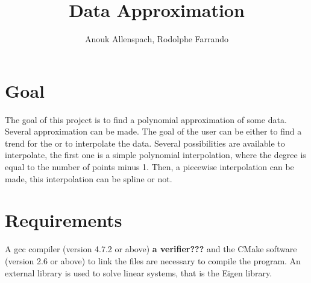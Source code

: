 \documentclass[12pt]{article}
\begin{document}
 
 
 
\title{Data Approximation}%
\author{Anouk Allenspach, Rodolphe Farrando}  
\maketitle
 

\section{Goal}
The goal of this project is to find a polynomial approximation of some data. Several approximation can be made. The goal of the user can be either to find a trend for the or to interpolate the data. Several possibilities are available to interpolate, the first one is a simple polynomial interpolation, where the degree is equal to the number of points minus 1. Then, a piecewise interpolation can be made, this interpolation can be spline or not.

\section{Requirements}
A gcc compiler (version 4.7.2 or above) \textbf{a verifier???} and the CMake software (version 2.6 or above) to link the files are necessary to compile the program. An external library is used to solve linear systems, that is the Eigen library.
\end{document}
